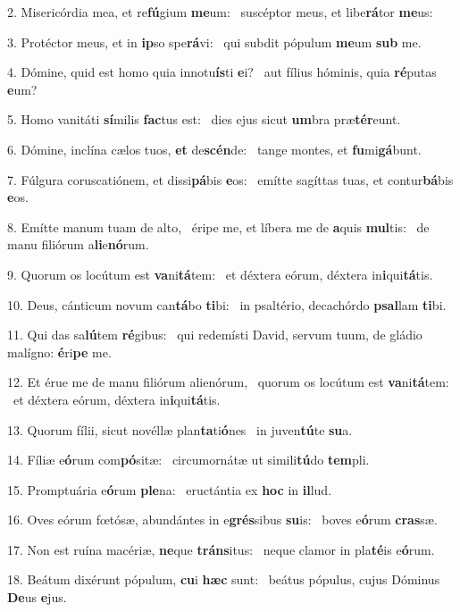 2. Misericórdia mea, et re\textbf{fú}gium \textbf{me}um: \ast\  suscéptor meus, et libe\textbf{rá}tor \textbf{me}us:\

3. Protéctor meus, et in \textbf{ip}so spe\textbf{rá}vi: \ast\  qui subdit pópulum \textbf{me}um \textbf{sub} me.\

4. Dómine, quid est homo quia innotu\textbf{ís}ti \textbf{e}i? \ast\  aut fílius hóminis, quia \textbf{ré}putas \textbf{e}um?\

5. Homo vanitáti \textbf{sí}milis \textbf{fac}tus est: \ast\  dies ejus sicut \textbf{um}bra præ\textbf{tér}eunt.\

6. Dómine, inclína cælos tuos, \textbf{et} de\textbf{scén}de: \ast\  tange montes, et \textbf{fu}mi\textbf{gá}bunt.\

7. Fúlgura coruscatiónem, et dissi\textbf{pá}bis \textbf{e}os: \ast\  emítte sagíttas tuas, et contur\textbf{bá}bis \textbf{e}os.\

8. Emítte manum tuam de alto, \dag\  éripe me, et líbera me de \textbf{a}quis \textbf{mul}tis: \ast\  de manu filiórum a\textbf{li}e\textbf{nó}rum.\

9. Quorum os locútum est \textbf{va}ni\textbf{tá}tem: \ast\  et déxtera eórum, déxtera in\textbf{i}qui\textbf{tá}tis.\

10. Deus, cánticum novum can\textbf{tá}bo \textbf{ti}bi: \ast\  in psaltério, decachórdo \textbf{psal}lam \textbf{ti}bi.\

11. Qui das sa\textbf{lú}tem \textbf{ré}gibus: \ast\  qui redemísti David, servum tuum, de gládio malígno: \textbf{é}ri\textbf{pe} me.\

12. Et érue me de manu filiórum alienórum, \dag\  quorum os locútum est \textbf{va}ni\textbf{tá}tem: \ast\  et déxtera eórum, déxtera in\textbf{i}qui\textbf{tá}tis.\

13. Quorum fílii, sicut novéllæ plan\textbf{ta}ti\textbf{ó}nes \ast\  in juven\textbf{tú}te \textbf{su}a.\

14. Fíliæ e\textbf{ó}rum com\textbf{pó}sitæ: \ast\  circumornátæ ut simili\textbf{tú}do \textbf{tem}pli.\

15. Promptuária e\textbf{ó}rum \textbf{ple}na: \ast\  eructántia ex \textbf{hoc} in \textbf{il}lud.\

16. Oves eórum fœtósæ, abundántes in e\textbf{grés}sibus \textbf{su}is: \ast\  boves e\textbf{ó}rum \textbf{cras}sæ.\

17. Non est ruína macériæ, \textbf{ne}que \textbf{tráns}itus: \ast\  neque clamor in pla\textbf{té}is e\textbf{ó}rum.\

18. Beátum dixérunt pópulum, \textbf{cu}i \textbf{hæc} sunt: \ast\  beátus pópulus, cujus Dóminus \textbf{De}us \textbf{e}jus.\

